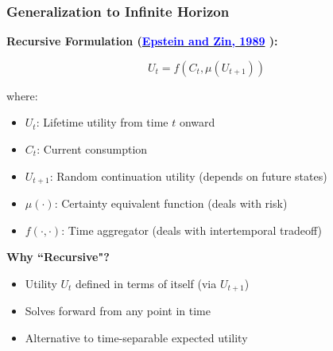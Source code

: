 \documentclass{beamer}
\begin{document}
\begin{frame}
    \frametitle{Generalization to Infinite Horizon}
    
    \textbf{Recursive Formulation (\href{https://doi.org/10.2307/1913778}{\textcolor{blue}{Epstein and Zin, 1989}} ):}
    
    \begin{tcolorbox}[colback=blue!5!white, colframe=blue!75!black, title=Recursive Utility]
    \begin{equation*}
        U_t = f(C_t, \mu(U_{t+1}))
    \end{equation*}
    \end{tcolorbox}
    
    
    where:
    \begin{itemize}
        \item $U_t$: Lifetime utility from time $t$ onward
        \item $C_t$: Current consumption
        \item $U_{t+1}$: Random continuation utility (depends on future states)
        \item $\mu(\cdot)$: Certainty equivalent function (deals with risk)
        \item $f(\cdot, \cdot)$: Time aggregator (deals with intertemporal tradeoff)
    \end{itemize}
    
    
    \textbf{Why ``Recursive"?}
    \begin{itemize}
        \item Utility $U_t$ defined in terms of itself (via $U_{t+1}$)
        \item Solves forward from any point in time
        \item Alternative to time-separable expected utility
    \end{itemize}
    
\end{frame}
\end{document}
